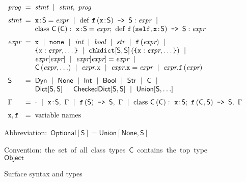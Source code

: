\documentclass[english,cleveref,crc]{programming}
\makeatletter
\newcommand{\code}[1]{\texttt{#1}}
\newcommand{\defeq}{=}
\newcommand{\langmid}{~\mid~} %
\newenvironment{langarray}{\(\begin{array}{l@{\hspace{2mm}}c@{\hspace{2mm}}l}}{\end{array}\)}
\newcommand{\spapp}[2]{#1\,(#2)}
\newcommand{\spann}[2]{#1\!:\!#2}
\newcommand{\typefont}[1]{\mathsf{#1}}
\newcommand{\codefont}[1]{\emph{#1}}
\newcommand{\paramtype}[2]{#1[#2]}
\newcommand{\sptype}{\typefont{S}}
\newcommand{\sptclass}{\typefont{C}}
\newcommand{\sptint}{\typefont{Int}}
\newcommand{\sptstr}{\typefont{Str}}
\newcommand{\sptbool}{\typefont{Bool}}
\newcommand{\sptdyn}{\typefont{Dyn}}
\newcommand{\sptobject}{\typefont{Object}}
\newcommand{\sptnone}{\typefont{None}}
\newcommand{\sptoptional}[1]{\paramtype{\typefont{Optional}}{#1}}
\newcommand{\sptunion}[1]{\paramtype{\typefont{Union}}{#1}}
\newcommand{\sptrawpydict}{\typefont{Dict}}
\newcommand{\sptrawchkdict}{\typefont{CheckedDict}} %
\newcommand{\sptpydict}[2]{\paramtype{\sptrawpydict}{#1, #2}}
\newcommand{\sptchkdict}[2]{\paramtype{\sptrawchkdict}{#1, #2}}
\newcommand{\sptenv}{\Gamma} %
\newcommand{\sptenvnil}{\cdot}
\newcommand{\sptvardef}[2]{\spann{#1}{#2}}
\newcommand{\sptfundef}[3]{\spapp{#1}{#2}\code{ -> }#3}
\newcommand{\sptclassdef}[4]{\mathrm{class}~\spapp{#1}{#2}:~#3;~#4}
\newcommand{\spx}{\code{x}}
\newcommand{\spf}{\code{f}}
\newcommand{\spc}{\sptclass}
\newcommand{\spprog}{\codefont{prog}}
\newcommand{\spstmt}{\codefont{stmt}}
\newcommand{\spexpr}{\codefont{expr}}
\newcommand{\spvardef}[3]{\sptvardef{#1}{#2} = #3}
\newcommand{\spfundef}[4]{\mathrm{def}~\spapp{#1}{#2}\code{ -> }#3: #4}
\newcommand{\spclassdef}[4]{\mathrm{class}~\spapp{#1}{#2}:~#3;~#4}
\newcommand{\spself}{\code{self}}
\newcommand{\spnone}{\code{none}}
\newcommand{\spint}{\codefont{int}}
\newcommand{\spbool}{\codefont{bool}}
\newcommand{\spstr}{\codefont{str}}
\newcommand{\sppydict}[1]{\code{\{}#1\code{\}}}
\newcommand{\spchkdict}[3]{\spapp{\paramtype{\code{chkdict}}{#1, #2}}{#3}}
\newcommand{\spcnew}[2]{\spapp{#1}{#2}}
\newcommand{\spdictref}[2]{#1[#2]}
\newcommand{\spdictset}[3]{\spdictref{#1}{#2} = #3}
\newcommand{\spobjref}[2]{#1.#2}
\newcommand{\spobjset}[3]{\spobjref{#1}{#2} = #3}
\newcommand{\spobjapp}[3]{\spobjref{#1}{\spapp{#2}{#3}}}
\makeatother
\begin{document}
\begin{figure}[t]
  \begin{langarray}
    \spprog & \defeq &
      \spstmt \langmid \spstmt,~\spprog
    \\[1.5ex]
    \spstmt & \defeq &
      \spvardef{\spx}{\sptype}{\spexpr} \langmid
      \spfundef{\spf}{\spann{\spx}{\sptype}}{\sptype}{\spexpr} \langmid
  \\ & &
      \spclassdef{\spc}{\spc}{\spvardef{\spx}{\sptype}{\spexpr}}{\spfundef{\spf}{\spself, \spann{\spx}{\sptype}}{\sptype}{\spexpr}}
    \\[1.5ex]
    \spexpr & \defeq &
      \spx \langmid \spnone \langmid \spint \langmid \spbool \langmid \spstr \langmid
      \spapp{\spf}{\spexpr} \langmid
  \\ & &
      \sppydict{\spx: \spexpr, \ldots} \langmid
      \spchkdict{\sptype}{\sptype}{\sppydict{\spx: \spexpr, \ldots}} \langmid
  \\ & &
      \spdictref{\spexpr}{\spexpr} \langmid
      \spdictset{\spexpr}{\spexpr}{\spexpr} \langmid
  \\ & &
      \spcnew{\sptclass}{\spexpr, \ldots} \langmid
      \spobjref{\spexpr}{\spx} \langmid
      \spobjset{\spexpr}{\spx}{\spexpr} \langmid
      \spobjapp{\spexpr}{\spf}{\spexpr}
    \\[1.5ex]
    \sptype & \defeq &
      \sptdyn \langmid
      \sptnone \langmid
      \sptint \langmid
      \sptbool \langmid
      \sptstr \langmid
      \sptclass \langmid
  \\ & &
      \sptpydict{\sptype}{\sptype} \langmid
      \sptchkdict{\sptype}{\sptype} \langmid
      \sptunion{\sptype, \ldots}
    \\[1.5ex]
    \sptenv & \defeq &
      \sptenvnil \langmid
      \sptvardef{\spx}{\sptype},~\sptenv \langmid
      \sptfundef{\spf}{\sptype}{\sptype},~\sptenv \langmid
      \sptclassdef{\spc}{\spc}{\sptvardef{\spx}{\sptype}}{\sptfundef{\spf}{\sptclass, \sptype}{\sptype}},~\sptenv
    \\[1.5ex]
    \spx, \spf & \defeq & \mbox{variable names}
  \end{langarray}

  \bigskip
  \mbox{Abbreviation: $\sptoptional{\sptype} \defeq \sptunion{\sptnone, \sptype}$}

  \medskip
  \mbox{Convention: the set of all class types $\sptclass$ contains the top type $\sptobject$}

  \caption{Surface syntax and types}
  \label{f:surface-types}
\end{figure}
\end{document}
